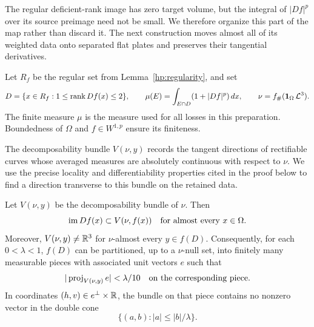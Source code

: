 The regular deficient-rank image has zero target volume, but the
integral of $|Df|^p$ over its source preimage need not be small.  We
therefore organize this part of the map rather than discard it.
The next construction moves almost all of its weighted data onto
separated flat plates and preserves their tangential derivatives.

Let $R_f$ be the regular set from Lemma~\ref{hp:regularity}, and set
\[
 D=\{x\in R_f:1\le\operatorname{rank} Df(x)\le2\},
 \qquad
 \mu(E)=\int_{E\cap D}(1+|Df|^p)\,dx,
 \qquad
 \nu=f_\#(\mathbf1_\Omega\,\mathcal L^3).
\]
The finite measure $\mu$ is the measure used for all losses in this
preparation.  Boundedness of $\Omega$ and $f\in W^{1,p}$ ensure
its finiteness.

The decomposability bundle $V(\nu,y)$ records the tangent directions
of rectifiable curves whose averaged measures are absolutely continuous
with respect to $\nu$.  We use the precise locality and differentiability
properties cited in the proof below to find a direction transverse to
this bundle on the retained data.

\begin{lemma}
\label{hp:transported-bundle}
Let $V(\nu,y)$ be the decomposability bundle of $\nu$.  Then
\begin{equation}\label{hp:range-in-bundle}
 \operatorname{im}Df(x)\subset V(\nu,f(x))
 \quad\hbox{for almost every }x\in\Omega.
\end{equation}
Moreover, $V(\nu,y)\ne\mathbb R^3$ for $\nu$-almost every $y\in f(D)$.
Consequently, for each $0<\lambda<1$, $f(D)$ can be partitioned,
up to a $\nu$-null set, into finitely many measurable pieces with
associated unit vectors $e$ such that
\begin{equation}\label{hp:almost-normal-direction}
 |\operatorname{proj}_{V(\nu,y)}e|<\lambda/10
 \quad\hbox{on the corresponding piece}.
\end{equation}
In coordinates $(h,v)\in e^\perp\times\mathbb R$, the bundle on that piece
contains no nonzero vector in the double cone
\[
 \{(a,b):|a|\le |b|/\lambda\}.
\]
\end{lemma}

